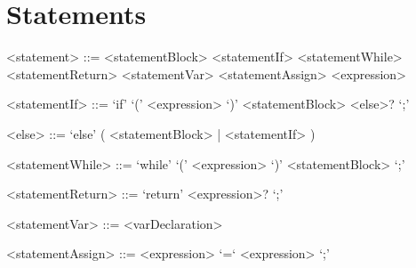 \section{Statements}

\setlength{\grammarparsep}{20pt plus 1pt minus 1pt}
\setlength{\grammarindent}{10em}
\begin{grammar}

<statement> ::= <statementBlock>
\alt <statementIf>
\alt <statementWhile>
\alt <statementReturn>
\alt <statementVar>
\alt <statementAssign>
\alt <expression>

<statementIf> ::= `if' `(' <expression> `)' <statementBlock> <else>? `;'

<else> ::= `else' ( <statementBlock> | <statementIf> )

<statementWhile> ::= `while' `(' <expression> `)' <statementBlock> `;'

<statementReturn> ::= `return' <expression>? `;'

<statementVar> ::= <varDeclaration>

<statementAssign> ::= <expression> `=` <expression> `;'

\end{grammar}

